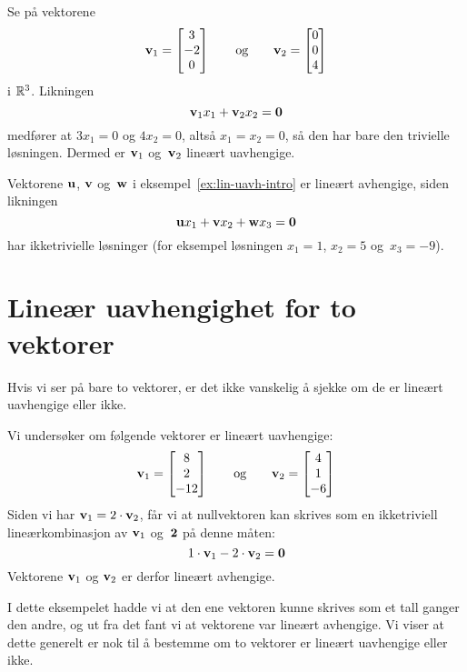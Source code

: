 \begin{ex}
Se på vektorene
\[
\mathbf{v}_1 = \begin{bmatrix} 3 \\ -2 \\ 0 \end{bmatrix}
\qquad\text{og}\qquad
\mathbf{v}_2 = \begin{bmatrix} 0 \\ 0 \\ 4 \end{bmatrix}
\]
i $\mathbb{R}^3$.  Likningen
\[
\mathbf{v}_1 x_1 + \mathbf{v}_2 x_2 = \mathbf{0}
\]
medfører at $3x_1 = 0$ og $4 x_2 = 0$, altså $x_1 = x_2 = 0$, så den
har bare den trivielle løsningen.  Dermed er $\mathbf{v}_1$ og~$\mathbf{v}_2$
lineært uavhengige.
\end{ex}

\begin{ex}
Vektorene $\mathbf{u}$, $\mathbf{v}$ og~$\mathbf{w}$ i
eksempel~\ref{ex:lin-uavh-intro} er lineært avhengige, siden likningen
\[
\mathbf{u} x_1 + \mathbf{v} x_2 + \mathbf{w} x_3 = \mathbf{0}
\]
har ikketrivielle løsninger (for eksempel løsningen $x_1 = 1$,
$x_2 = 5$ og~$x_3 = -9$).
\end{ex}



\section*{Lineær uavhengighet for to vektorer}

Hvis vi ser på bare to vektorer, er det ikke vanskelig å sjekke om de
er lineært uavhengige eller ikke.

\begin{ex}
\label{ex:to-vektorer-lin-avh}
Vi undersøker om følgende vektorer er lineært uavhengige:
\[
\mathbf{v}_1 = \begin{bmatrix} 8 \\ 2 \\ -12 \end{bmatrix}
\qquad\text{og}\qquad
\mathbf{v}_2 = \begin{bmatrix} 4 \\ 1 \\ -6 \end{bmatrix}
\]
Siden vi har $\mathbf{v}_1 = 2 \cdot \mathbf{v}_2$, får vi at nullvektoren kan
skrives som en ikketriviell lineærkombinasjon av $\mathbf{v}_1$ og~$\mathbf{2}$
på denne måten:
\[
1 \cdot \mathbf{v}_1 - 2 \cdot \mathbf{v}_2 = \mathbf{0}
\]
Vektorene $\mathbf{v}_1$ og $\mathbf{v}_2$ er derfor lineært avhengige.
\end{ex}

I dette eksempelet hadde vi at den ene vektoren kunne skrives som et
tall ganger den andre, og ut fra det fant vi at vektorene var lineært
avhengige.  Vi viser at dette generelt er nok til å bestemme om to
vektorer er lineært uavhengige eller ikke.

